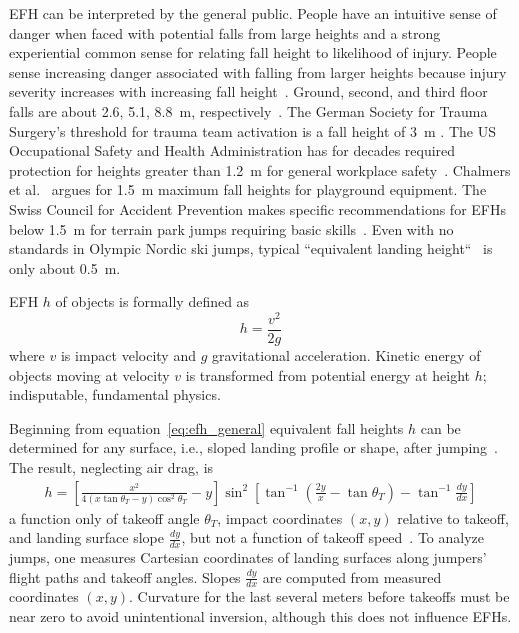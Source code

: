 \documentclass{article}
\begin{document}
EFH can be interpreted by the general public. People have an intuitive sense of
danger when faced with potential falls from large heights and a strong
experiential common sense for relating fall height to likelihood of injury.
People sense increasing danger associated with falling from larger heights
because injury severity increases with increasing fall height~\cite{Nau2021}.
Ground, second, and third floor falls are about 2.6, 5.1, 8.8~\si{\meter},
respectively~\cite{Vish2005}. The German Society for Trauma Surgery's threshold
for trauma team activation is a fall height of 3~\si{\meter}
\cite{PolytraumaGuidelineUpdateGroup2018}. The US Occupational Safety and
Health Administration has for decades required protection for heights greater
than 1.2~\si{\meter} for general workplace safety~\cite{OSHA2021}.  Chalmers et
al.~\cite{Chalmers1996} argues for 1.5~\si{\meter} maximum fall heights for
playground equipment. The Swiss Council for Accident Prevention makes specific
recommendations for EFHs below 1.5~\si{\meter} for terrain park jumps requiring
basic skills~\cite{Heer2019}.  Even with no standards in Olympic Nordic ski
jumps, typical ``equivalent landing height``~\cite{Gasser2018} is only about
0.5~\si{\meter}.

EFH $h$ of objects is formally defined as
%
\begin{equation}
  h = \frac{v^2}{2g}
  \label{eq:efh_general}
\end{equation}
%
where $v$ is impact velocity and $g$ gravitational acceleration.  Kinetic
energy of objects moving at  velocity $v$  is transformed from potential energy
at height $h$; indisputable, fundamental physics.

Beginning from equation~\ref{eq:efh_general} equivalent fall heights $h$ can be
determined for any surface, i.e., sloped landing profile or shape, after
jumping~\cite{Petrone2017}. The result, neglecting air drag, is
%
\begin{align}
  h = \left[\frac{x^2}{4(x\tan\theta_T - y)\cos^{2}\theta_T} - y\right]
    \sin^{2}
    \left[\tan^{-1}\left(\frac{2y}{x} - \tan\theta_T\right) -
    \tan^{-1}\frac{dy}{dx}\right]
  \label{eq:efh}
\end{align}
%
a function only of takeoff angle $\theta_T$, impact coordinates $(x,y)$
relative to takeoff, and landing surface slope $\frac{dy}{dx}$, but not a
function of takeoff speed~\cite{Petrone2017}. To analyze jumps, one measures
Cartesian coordinates of landing surfaces along jumpers' flight paths and
takeoff angles. Slopes $\frac{dy}{dx}$ are computed from measured coordinates
$(x,y)$. Curvature for the last several meters before takeoffs must be near
zero to avoid unintentional inversion, although this does not influence EFHs.
\end{document}
